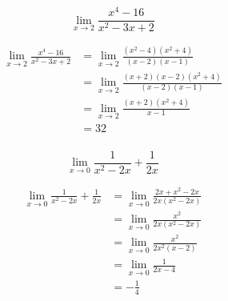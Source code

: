 \documentclass[letterpaper, landscape]{exam}
\begin{document}
\begin{questions}
    \question[10]
      \[
        \lim_{x \to 2} \frac{x^4 - 16}{x^2 - 3x + 2}
      \]

      \begin{solution}
        \begin{align*}
          \lim_{x \to 2} \frac{x^4 - 16}{x^2 - 3x + 2} & = \lim_{x \to 2} \frac{\left( x^2 - 4\right) \left( x^2 + 4 \right)}{(x - 2)(x - 1)} \\
                                                       & = \lim_{x \to 2} \frac{(x + 2) (x - 2) \left( x^2 + 4 \right)}{(x - 2)(x - 1)} \\
                                                       & = \lim_{x \to 2} \frac{(x + 2) \left( x^2 + 4 \right)}{x - 1} \\
                                                       & = \boxed{ 32 } \\
        \end{align*}
      \end{solution}

    \question[10]
      \[
        \lim_{x \to 0} \frac{1}{x^2 - 2x} + \frac{1}{2x}
      \]

      \begin{solution}
        \begin{align*}
        \lim_{x \to 0} \frac{1}{x^2 - 2x} + \frac{1}{2x} & = \lim_{x \to 0} \frac{2x + x^2 - 2x}{2x\left( x^2 - 2x \right)} \\
                                                         & = \lim_{x \to 0} \frac{x^2}{2x \left( x^2 - 2x \right)} \\
                                                         & = \lim_{x \to 0} \frac{x^2}{2x^2 (x - 2)} \\
                                                         & = \lim_{x \to 0} \frac{1}{2x - 4} \\
                                                         & = \boxed{ - \frac{1}{4} } \\
        \end{align*}
      \end{solution}






\end{questions}
\end{document}
